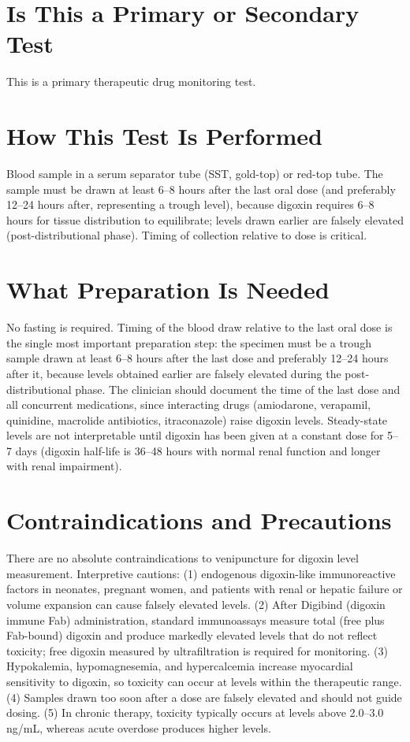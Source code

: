 \section*{Is This a Primary or Secondary Test}
This is a primary therapeutic drug monitoring test.

\section*{How This Test Is Performed}
Blood sample in a serum separator tube (SST, gold-top) or red-top tube. The sample must be drawn at least 6--8 hours after the last oral dose (and preferably 12--24 hours after, representing a trough level), because digoxin requires 6--8 hours for tissue distribution to equilibrate; levels drawn earlier are falsely elevated (post-distributional phase). Timing of collection relative to dose is critical.

\section*{What Preparation Is Needed}
No fasting is required. Timing of the blood draw relative to the last oral dose is the single most important preparation step: the specimen must be a trough sample drawn at least 6--8 hours after the last dose and preferably 12--24 hours after it, because levels obtained earlier are falsely elevated during the post-distributional phase. The clinician should document the time of the last dose and all concurrent medications, since interacting drugs (amiodarone, verapamil, quinidine, macrolide antibiotics, itraconazole) raise digoxin levels. Steady-state levels are not interpretable until digoxin has been given at a constant dose for 5--7 days (digoxin half-life is 36--48 hours with normal renal function and longer with renal impairment).

\section*{Contraindications and Precautions}
There are no absolute contraindications to venipuncture for digoxin level measurement. Interpretive cautions: (1) endogenous digoxin-like immunoreactive factors in neonates, pregnant women, and patients with renal or hepatic failure or volume expansion can cause falsely elevated levels. (2) After Digibind (digoxin immune Fab) administration, standard immunoassays measure total (free plus Fab-bound) digoxin and produce markedly elevated levels that do not reflect toxicity; free digoxin measured by ultrafiltration is required for monitoring. (3) Hypokalemia, hypomagnesemia, and hypercalcemia increase myocardial sensitivity to digoxin, so toxicity can occur at levels within the therapeutic range. (4) Samples drawn too soon after a dose are falsely elevated and should not guide dosing. (5) In chronic therapy, toxicity typically occurs at levels above 2.0--3.0 ng/mL, whereas acute overdose produces higher levels.

